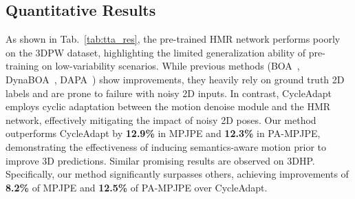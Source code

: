 \begin{table*}[!tbp]
\caption{Comparison of semantics-incorporated techniques on the 3DPW dataset~\cite{3dpw} based on HMR network. Building on CycleAdapt~\cite{cycleadapt}, we design two methods to enhance pose semantics with generated motion sequences from~\cite{motiongpt}. 
``\textit{downtown\_rampAndStairs}'' and ``\textit{downtown\_bar}'' highlight different challenges. The former involves depth ambiguity when viewing people ascending stairs from behind, while the latter includes obstacles in a low-lighting bar environment.
Our method consistently improves across videos while others do not.}
\label{tab:motion_prior} 
\centering
{}
 \vspace{-0.2in}
\end{table*}


\subsection{Quantitative Results}

 
As shown in Tab.~\ref{tab:tta_res}, the pre-trained HMR network performs poorly on the 3DPW dataset, highlighting the limited generalization ability of pre-training on low-variability scenarios. While previous methods (BOA~\cite{boa}, DynaBOA~\cite{dynaboa}, DAPA~\cite{DAPA}) show improvements, they heavily rely on ground truth 2D labels and are prone to failure with noisy 2D inputs. In contrast, CycleAdapt~\cite{cycleadapt} employs cyclic adaptation between the motion denoise module and the HMR network, effectively mitigating the impact of noisy 2D poses. Our method outperforms CycleAdapt by \textbf{12.9\%} in MPJPE and \textbf{12.3\%} in PA-MPJPE, demonstrating the effectiveness of inducing semantics-aware motion prior to improve 3D predictions. 
Similar promising results are observed on 3DHP. 
Specifically,
our method significantly surpasses others, achieving improvements of \textbf{8.2\%} of MPJPE and \textbf{12.5\%} of PA-MPJPE over CycleAdapt. 

